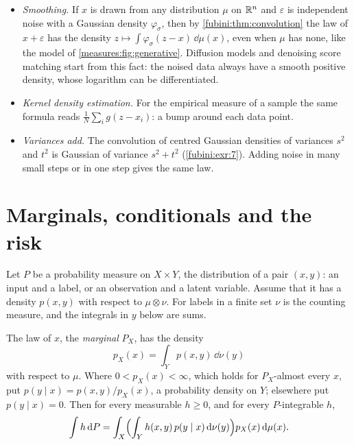 \begin{notechapter}
\begin{mlthread}
\begin{itemize}[nosep]
  \item \emph{Smoothing.} If $x$ is drawn from any distribution $\mu$
        on $\mathbb{R}^n$ and $\varepsilon$ is independent noise with a Gaussian
        density $\varphi_\sigma$, then by \cref{fubini:thm:convolution}
        the law of $x + \varepsilon$ has the density
        $z\mapsto\int\varphi_\sigma(z - x)\,\dd\mu(x)$, even when $\mu$
        has none, like the model of \cref{measures:fig:generative}.
        Diffusion models and denoising score matching start from this
        fact: the noised data always have a smooth positive density,
        whose logarithm can be differentiated.
  \item \emph{Kernel density estimation.} For the empirical measure of
        a sample the same formula reads
        $\frac1N\sum_ig(z - x_i)$: a bump around each data point.
  \item \emph{Variances add.} The convolution of centred Gaussian
        densities of variances $s^2$ and $t^2$ is Gaussian of variance
        $s^2 + t^2$ (\cref{fubini:exr:7}). Adding noise in many small
        steps or in one step gives the same law.
\end{itemize}
\end{mlthread}

\section{Marginals, conditionals and the risk}\label{fubini:sec:ml}

Let $P$ be a probability measure on $X\times Y$, the distribution of a
pair $(x, y)$: an input and a label, or an observation and a latent
variable. Assume that it has a density $p(x, y)$ with respect to
$\mu\otimes\nu$. For labels in a finite set $\nu$ is the counting
measure, and the integrals in $y$ below are sums.

\begin{proposition}
\label{fubini:prop:marginal}
The law of $x$, the \emph{marginal} $P_X$, has the density
\[
  p_X(x) = \int_Yp(x, y)\,\dd\nu(y)
\]
with respect to $\mu$. Where $0 < p_X(x) < \infty$, which holds for
$P_X$-almost every $x$, put $p(y\mid x) = p(x, y)/p_X(x)$, a probability
density on $Y$; elsewhere put $p(y\mid x) = 0$. Then for every
measurable $h\geq0$, and for every
$P$-integrable $h$,
\[
  \int h\,\mathrm{d} P
  = \int_X\Bigl(\int_Yh(x, y)\,p(y\mid x)\,\mathrm{d}\nu(y)\Bigr)
    p_X(x)\,\mathrm{d}\mu(x) .
\]
\end{proposition}


\end{notechapter}
